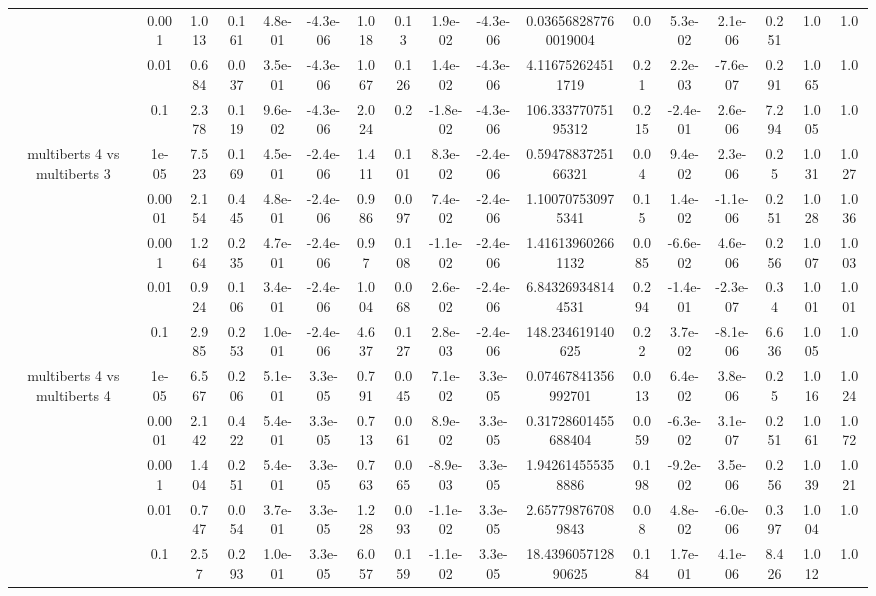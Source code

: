 \begin{tabular}{|c|c|c|c|c|c|c|c|c|c|c|c|c|c|c|c|c|}
 & 0.001 & 1.013 & 0.161 & 4.8e-01 & -4.3e-06 & 1.018 & 0.13 & 1.9e-02 & -4.3e-06 & 0.036568287760019004 & 0.0 & 5.3e-02 & 2.1e-06 & 0.251 & 1.0 & 1.0 \\
 & 0.01 & 0.684 & 0.037 & 3.5e-01 & -4.3e-06 & 1.067 & 0.126 & 1.4e-02 & -4.3e-06 & 4.116752624511719 & 0.21 & 2.2e-03 & -7.6e-07 & 0.291 & 1.065 & 1.0 \\
 & 0.1 & 2.378 & 0.119 & 9.6e-02 & -4.3e-06 & 2.024 & 0.2 & -1.8e-02 & -4.3e-06 & 106.33377075195312 & 0.215 & -2.4e-01 & 2.6e-06 & 7.294 & 1.005 & 1.0 \\
\hline
\multirow{5}{*}{multiberts 4 vs multiberts 3} & 1e-05 & 7.523 & 0.169 & 4.5e-01 & -2.4e-06 & 1.411 & 0.101 & 8.3e-02 & -2.4e-06 & 0.5947883725166321 & 0.04 & 9.4e-02 & 2.3e-06 & 0.25 & 1.031 & 1.027 \\
 & 0.0001 & 2.154 & 0.445 & 4.8e-01 & -2.4e-06 & 0.986 & 0.097 & 7.4e-02 & -2.4e-06 & 1.100707530975341 & 0.15 & 1.4e-02 & -1.1e-06 & 0.251 & 1.028 & 1.036 \\
 & 0.001 & 1.264 & 0.235 & 4.7e-01 & -2.4e-06 & 0.97 & 0.108 & -1.1e-02 & -2.4e-06 & 1.416139602661132 & 0.085 & -6.6e-02 & 4.6e-06 & 0.256 & 1.007 & 1.003 \\
 & 0.01 & 0.924 & 0.106 & 3.4e-01 & -2.4e-06 & 1.004 & 0.068 & 2.6e-02 & -2.4e-06 & 6.843269348144531 & 0.294 & -1.4e-01 & -2.3e-07 & 0.34 & 1.001 & 1.001 \\
 & 0.1 & 2.985 & 0.253 & 1.0e-01 & -2.4e-06 & 4.637 & 0.127 & 2.8e-03 & -2.4e-06 & 148.234619140625 & 0.22 & 3.7e-02 & -8.1e-06 & 6.636 & 1.005 & 1.0 \\
\hline
\multirow{5}{*}{multiberts 4 vs multiberts 4} & 1e-05 & 6.567 & 0.206 & 5.1e-01 & 3.3e-05 & 0.791 & 0.045 & 7.1e-02 & 3.3e-05 & 0.07467841356992701 & 0.013 & 6.4e-02 & 3.8e-06 & 0.25 & 1.016 & 1.024 \\
 & 0.0001 & 2.142 & 0.422 & 5.4e-01 & 3.3e-05 & 0.713 & 0.061 & 8.9e-02 & 3.3e-05 & 0.31728601455688404 & 0.059 & -6.3e-02 & 3.1e-07 & 0.251 & 1.061 & 1.072 \\
 & 0.001 & 1.404 & 0.251 & 5.4e-01 & 3.3e-05 & 0.763 & 0.065 & -8.9e-03 & 3.3e-05 & 1.942614555358886 & 0.198 & -9.2e-02 & 3.5e-06 & 0.256 & 1.039 & 1.021 \\
 & 0.01 & 0.747 & 0.054 & 3.7e-01 & 3.3e-05 & 1.228 & 0.093 & -1.1e-02 & 3.3e-05 & 2.657798767089843 & 0.08 & 4.8e-02 & -6.0e-06 & 0.397 & 1.004 & 1.0 \\
 & 0.1 & 2.57 & 0.293 & 1.0e-01 & 3.3e-05 & 6.057 & 0.159 & -1.1e-02 & 3.3e-05 & 18.439605712890625 & 0.184 & 1.7e-01 & 4.1e-06 & 8.426 & 1.012 & 1.0 \\

\end{tabular}
